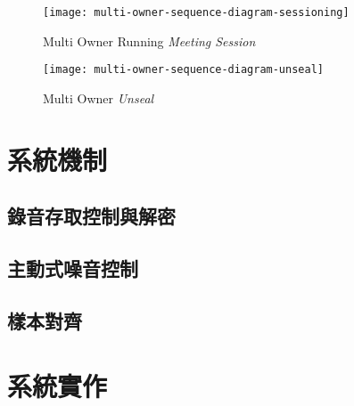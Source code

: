 \begin{figure}[H]
    \centering
    \texttt{[image: multi-owner-sequence-diagram-sessioning]}
    \caption{Multi Owner Running {\it Meeting Session}}
    \label{fig.m-o-sessioning}
\end{figure}

\begin{figure}[H]
    \centering
    \texttt{[image: multi-owner-sequence-diagram-unseal]}
    \caption{Multi Owner {\it Unseal}}
    \label{fig.m-o-unseal}
\end{figure}


\section{系統機制}

\subsection{錄音存取控制與解密}

\subsection{主動式噪音控制}

\subsection{樣本對齊}

\section{系統實作}
